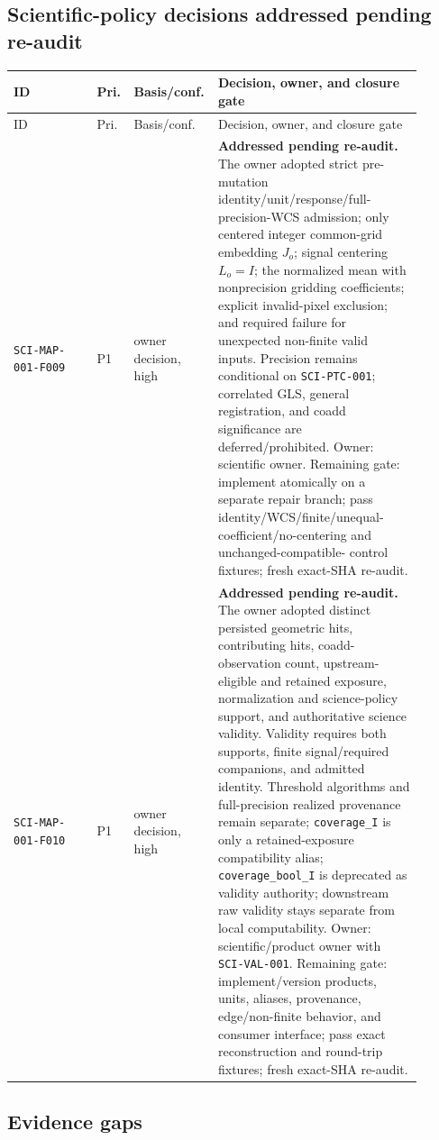 \documentclass[11pt]{article}
\newcommand{\code}[1]{\nolinkurl{#1}}
\begin{document}
\subsection{Scientific-policy decisions addressed pending re-audit}

\begin{longtable}{L{0.20\linewidth}L{0.06\linewidth}L{0.15\linewidth}L{0.49\linewidth}}
\toprule
ID & Pri. & Basis/conf. & Decision, owner, and closure gate\\
\midrule
\endfirsthead
\toprule
ID & Pri. & Basis/conf. & Decision, owner, and closure gate\\
\midrule
\endhead
\code{SCI-MAP-001-F009} & P1 & owner decision, high &
\textbf{Addressed pending re-audit.}  The owner adopted strict pre-mutation
identity/unit/response/full-precision-WCS admission; only centered integer
common-grid embedding \(J_o\); signal centering \(L_o=I\); the normalized mean
with nonprecision gridding coefficients; explicit invalid-pixel exclusion; and
required failure for unexpected non-finite valid inputs.  Precision remains
conditional on \code{SCI-PTC-001}; correlated GLS, general registration, and
coadd significance are deferred/prohibited.  Owner: scientific owner.
Remaining gate: implement atomically on a separate repair branch; pass
identity/WCS/finite/unequal-coefficient/no-centering and unchanged-compatible-
control fixtures; fresh exact-SHA re-audit.\\
\code{SCI-MAP-001-F010} & P1 & owner decision, high &
\textbf{Addressed pending re-audit.}  The owner adopted distinct persisted
geometric hits, contributing hits, coadd-observation count, upstream-eligible
and retained exposure, normalization and science-policy support, and
authoritative science validity.  Validity requires both supports, finite
signal/required companions, and admitted identity.  Threshold algorithms and
full-precision realized provenance remain separate; \code{coverage_I} is only
a retained-exposure compatibility alias; \code{coverage_bool_I} is deprecated
as validity authority; downstream raw validity stays separate from local
computability.  Owner: scientific/product owner with \code{SCI-VAL-001}.
Remaining gate: implement/version products, units, aliases, provenance,
edge/non-finite behavior, and consumer interface; pass exact reconstruction
and round-trip fixtures; fresh exact-SHA re-audit.\\
\bottomrule
\end{longtable}

\subsection{Evidence gaps}
\end{document}
